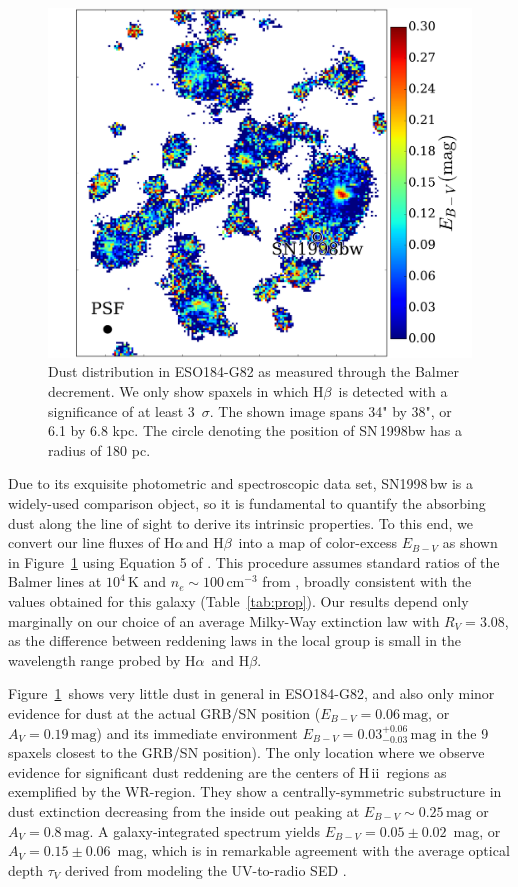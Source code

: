 \documentclass[traditabstract]{aa}
\newcommand{\hb}{H$\beta$}
\newcommand{\ha}{H$\alpha$}
\newcommand{\hii}{\mbox{H\,{\sc ii}}}
\begin{document}
\begin{figure}
\includegraphics[angle=0, width=0.99\columnwidth]{Figs/MUSE_SN1998bw_EB-V.pdf}
\caption{Dust distribution in ESO184-G82 as measured through the Balmer decrement. We only show spaxels in which \hb\, is detected with a significance of at least 3~$\sigma$. The shown image spans 34" by 38", or 6.1 by 6.8 kpc. The circle denoting the position of SN\,1998bw has a radius of 180 pc.}
\label{fig:ebv}
\end{figure}

Due to its exquisite photometric and spectroscopic data set, SN1998\,bw is a widely-used comparison object, so it is fundamental to quantify the absorbing dust along the line of sight to derive its intrinsic properties. To this end, we convert our line fluxes of \ha\,and \hb\, into a map of color-excess $E_{B-V}$ as shown in Figure~\ref{fig:ebv} using Equation 5 of \citet{2015A&A...581A.125K}. This procedure assumes standard ratios of the Balmer lines at $10^4$\,K and $n_e\sim100\,\mathrm{cm}^{-3}$ from \citet{1989agna.book.....O}, broadly consistent with the values obtained for this galaxy (Table~\ref{tab:prop}). Our results depend only marginally on our choice of an average Milky-Way extinction law \citep{1992ApJ...395..130P} with $R_V=3.08$, as the difference between reddening laws in the local group is small in the wavelength range probed by \ha\, and \hb. 

Figure~\ref{fig:ebv}~shows very little dust in general in ESO184-G82, and also only minor evidence for dust at the actual GRB/SN position ($E_{B-V} = 0.06\,\mathrm{mag}$, or $A_V = 0.19\,\mathrm{mag}$) and its immediate environment $E_{B-V} = 0.03_{-0.03}^{+0.06}\,\mathrm{mag}$ in the 9 spaxels closest to the GRB/SN position). The only location where we observe evidence for significant dust reddening are the centers of \hii\, regions as exemplified by the WR-region. They show a centrally-symmetric substructure in dust extinction decreasing from the inside out peaking at $E_{B-V} \sim 0.25\,\mathrm{mag}$ or $A_V = 0.8\,\mathrm{mag}$. A galaxy-integrated spectrum yields $E_{B-V} = 0.05\pm0.02$~mag, or $A_V=0.15\pm0.06$~mag, which is in remarkable agreement with the average optical depth $\tau_V$ derived from modeling the UV-to-radio SED \citep{2014A&A...562A..70M}.
\end{document}
